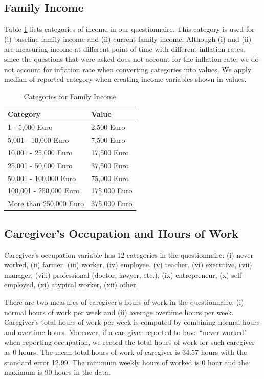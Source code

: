 \subsection{Family Income}

Table \ref{tab:faminc} lists categories of income in our questionnaire. This category is used for (i) baseline family income and (ii) current family income. Although (i) and (ii) are measuring income at different point of time with different inflation rates, since the questions that were asked does not account for the inflation rate, we do not account for inflation rate when converting categories into values. We apply median of reported category when creating income variables shown in values. 

\begin{table}[H]
\caption{Categories for Family Income} \label{tab:faminc}
\begin{center}
\begin{tabular}{ll}
\toprule
\textbf{Category} & \textbf{Value} \\ \midrule
	1 - 5,000 Euro					 & 2,500 Euro \\
	5,001 - 10,000 Euro				 & 7,500 Euro \\
	10,001 - 25,000 Euro			 & 17,500 Euro \\
	25,001 - 50,000 Euro			 & 37,500 Euro \\
	50,001 - 100,000 Euro			 & 75,000 Euro \\
	100,001 - 250,000 Euro			 & 175,000 Euro \\
	More than 250,000 Euro			 & 375,000 Euro \\ \bottomrule
\end{tabular}
\end{center}
\end{table}
	
\subsection{Caregiver's Occupation and Hours of Work}
Caregiver's occupation variable has 12 categories in the questionnaire: (i) never worked, (ii) farmer, (iii) worker, (iv) employee, (v) teacher, (vi) executive, (vii) manager, (viii) professional (doctor, lawyer, etc.), (ix) entrepreneur, (x) self-employed, (xi) atypical worker, (xii) other.  

There are two measures of caregiver's hours of work in the questionnaire: (i) normal hours of work per week and (ii) average overtime hours per week. Caregiver's total hours of work per week is computed by combining normal hours and overtime hours. Moreover, if a caregiver reported to have ``never worked" when reporting occupation, we record the total hours of work for such caregiver as 0 hours. The mean total hours of work of caregiver is  34.57 hours with the standard error 12.99. The minimum weekly hours of worked is 0 hour and the maximum is 90 hours in the data.

